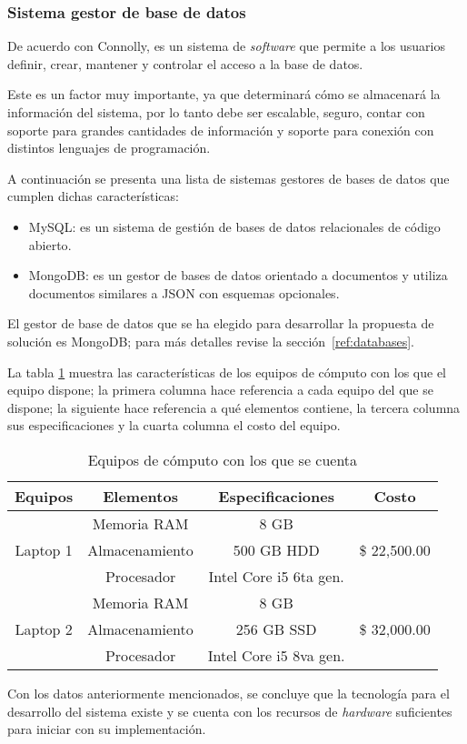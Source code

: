 \subsubsection*{Sistema gestor de base de datos}

De acuerdo con Connolly\cite{connolly_database_2005}, es un sistema de \textit{software} que permite a los usuarios definir, crear, mantener y controlar el acceso a la base de datos.


Este es un factor muy importante, ya que determinará cómo se almacenará la información del sistema, por lo tanto debe ser escalable, seguro, contar con soporte para grandes cantidades de información y soporte para conexión con distintos lenguajes de programación.


A continuación se presenta una lista de sistemas gestores de bases de datos que cumplen dichas características:

\begin{itemize}
    \item MySQL: es un sistema de gestión de bases de datos relacionales de código abierto\cite{dubois_mysql_1999}.
    \item MongoDB: es un gestor de bases de datos orientado a documentos y utiliza documentos similares a JSON con esquemas opcionales\cite{banker_mongodb_2011}.
\end{itemize}

El gestor de base de datos que se ha elegido para desarrollar la propuesta de solución es MongoDB; para más detalles revise la sección~\ref{ref:databases}.


La tabla \ref{tab:hw_devices} muestra las características de los equipos de cómputo con los que el equipo dispone; la primera columna hace referencia a cada equipo del que se dispone; la siguiente hace referencia a qué elementos contiene, la tercera columna sus especificaciones y la cuarta columna el costo del equipo.

\begin{table}[H]
    \centering
    \begin{tabular}{|c|c|c|c|}
        \hline
        Equipos & Elementos & Especificaciones & Costo \\ \hline
        \multirow{3}{*}{Laptop 1} & Memoria RAM & 8 GB & \\
        & Almacenamiento & 500 GB HDD & \$ 22,500.00  \\
        & Procesador & Intel Core i5 6ta gen. & \\ \hline
        \multirow{3}{*}{Laptop 2} & Memoria RAM & 8 GB & \\
        & Almacenamiento & 256 GB SSD & \$ 32,000.00 \\
        & Procesador & Intel Core i5 8va gen. & \\ \hline
    \end{tabular}
    \caption{Equipos de cómputo con los que se cuenta}
    \label{tab:hw_devices}
\end{table}


Con los datos anteriormente mencionados, se concluye que la tecnología para el desarrollo del sistema existe y se cuenta con los recursos de \textit{hardware} suficientes para iniciar con su implementación.